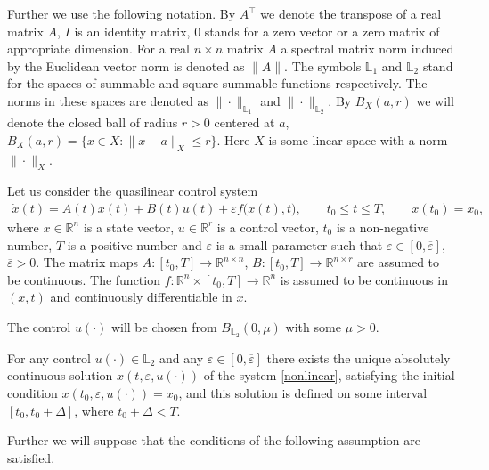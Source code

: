 \documentclass[../main.tex]{subfiles}
\begin{document}
Further we use the following notation. By $A^{\top}$ we denote the transpose of a real matrix $A$, $I$ is an identity matrix, $0$ stands for a zero vector or a zero matrix of appropriate dimension. 
For a real $n \times n$ matrix $A$ a spectral matrix norm induced by the Euclidean vector norm is denoted as $\|A\|$.
The symbols $\mathbb{L}_1$ and $\mathbb{L}_2$ stand for the spaces of summable and square summable functions respectively. The norms in these spaces are denoted as $\|\cdot\|_{\mathbb{L}_1}$ and $\|\cdot\|_{\mathbb{L}_2}$. By $B_X(a,r)$ we will denote the closed ball of radius $r>0$ centered at $a$, $B_X(a, r) = \{x\in X: \|x-a\|_X \leqslant r \}$. Here $X$ is some linear space with a norm $\|\cdot\|_X$.


Let us consider the quasilinear control system
\begin{gather}\label{nonlinear}
	\dot{x}(t) = A(t)x(t)+B(t)u(t)+\varepsilon f\big(x(t),t\big), \qquad t_0 \leqslant t \leqslant T, \qquad x(t_0) = x_0,
\end{gather}
where $ x \in \mathbb{R}^n $ is a state vector, $ u \in \mathbb{R}^r $ is a control vector, $t_0$ is a non-negative number, $T$ is a positive number and $\varepsilon$ is a small parameter such that  $\varepsilon \in [0,\overline{\varepsilon}]$, $ \overline{\varepsilon} > 0$. The matrix maps  $A:[t_0,T] \to \mathbb{R}^{n\times n} $, $B: [t_0,T] \to \mathbb{R}^{n\times r} $ are assumed to be continuous. The function $f: \mathbb{R}^n \times [t_0,T] \to \mathbb{R}^n$ is assumed to be continuous in $(x,t)$ and continuously differentiable in $x$.

The control $ u(\cdot) $ will be chosen from $ B_{\mathbb{L}_2}(0,\mu) $ with some $ \mu > 0$.

For any control $u(\cdot) \in \mathbb{L}_2$ and any $\varepsilon \in [0,\overline{\varepsilon}]$ there exists the unique absolutely continuous solution $ x(t,\varepsilon, u(\cdot)) $ of the system \eqref{nonlinear}, satisfying the initial condition $ x(t_0,\varepsilon, u(\cdot)) = x_0$, and this solution is defined on some interval $[t_0, t_0 + \Delta]$, where $t_0 + \Delta < T$. 

Further we will suppose that the conditions of the following assumption are satisfied.
\end{document}
